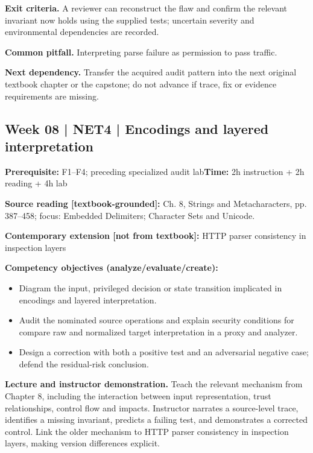 \documentclass[10pt,letterpaper]{article}
\begin{document}
\textbf{Exit criteria.} A reviewer can reconstruct the flaw and confirm the relevant invariant now holds using the supplied tests; uncertain severity and environmental dependencies are recorded.

\textbf{Common pitfall.} Interpreting parse failure as permission to pass traffic.

\textbf{Next dependency.} Transfer the acquired audit pattern into the next original textbook chapter or the capstone; do not advance if trace, fix or evidence requirements are missing.

\subsection{Week 08 | NET4 | Encodings and layered interpretation}
\textbf{Prerequisite:} F1--F4; preceding specialized audit lab\hfill\textbf{Time:} 2h instruction + 2h reading + 4h lab

\textbf{Source reading [textbook-grounded]:} Ch. 8, Strings and Metacharacters, pp. 387--458; focus: Embedded Delimiters; Character Sets and Unicode.

\textbf{Contemporary extension [not from textbook]:} HTTP parser consistency in inspection layers

\textbf{Competency objectives (analyze/evaluate/create):}
\begin{itemize}[leftmargin=*,itemsep=2pt]
\item Diagram the input, privileged decision or state transition implicated in encodings and layered interpretation.
\item Audit the nominated source operations and explain security conditions for compare raw and normalized target interpretation in a proxy and analyzer.
\item Design a correction with both a positive test and an adversarial negative case; defend the residual-risk conclusion.
\end{itemize}
\textbf{Lecture and instructor demonstration.} Teach the relevant mechanism from Chapter 8, including the interaction between input representation, trust relationships, control flow and impacts. Instructor narrates a source-level trace, identifies a missing invariant, predicts a failing test, and demonstrates a corrected control. Link the older mechanism to HTTP parser consistency in inspection layers, making version differences explicit.
\end{document}
